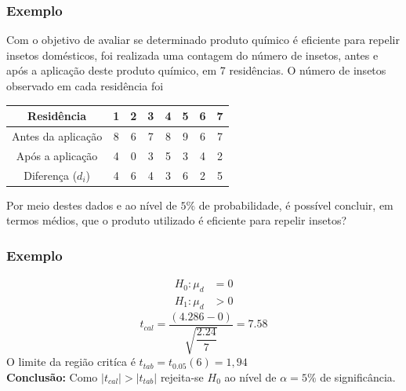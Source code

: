 \documentclass[14pt,aspectratio=1610]{beamer}
\newcommand{\Ho}{\ensuremath{H_{0}}}
\begin{document}
\begin{frame}{}
\frametitle{Exemplo}
\small
\begin{block}{}
\justifying
Com o objetivo de avaliar se determinado produto químico é eficiente para repelir insetos domésticos, foi realizada uma 
contagem do número de insetos, antes e após a aplicação deste produto químico, em 7 residências. O número de insetos 
observado em cada residência foi
\begin{table}[]
\begin{tabular}{c|ccccccc}
             Residência & 1 & 2 & 3 & 4 & 5 & 6 & 7\\ \hline
Antes da aplicação & 8 & 6 & 7 & 8 & 9 & 6 & 7 \\ 
Após a aplicação    & 4 & 0 & 3 & 5 & 3 & 4 & 2 \\ \hline
Diferença ($d_{i}$)      & 4 & 6 & 4 & 3 & 6 & 2 & 5 \\ \hline
\end{tabular}
\end{table}
Por meio destes dados e ao nível de $5\%$ de probabilidade, é possível concluir, em termos médios, que o produto 
utilizado é eficiente para repelir insetos?
\end{block}
\end{frame}

\begin{frame}{}
\frametitle{Exemplo}
\begin{block}{}
\justifying
\begin{align*}
H_{0}: \mu_{d}&=0 \\ 
H_{1}: \mu_{d}&> 0
\end{align*}
$$t_{cal}=\dfrac{(4.286-0)}{\sqrt{\dfrac{2.24}{7}}}=7.58$$
O limite da região critíca é $t_{tab}=t_{0.05}(6)=1,94$\\
\textbf{Conclusão:} Como $|t_{cal}|>|t_{tab}|$ rejeita-se $\Ho$ ao nível de $\alpha=5\%$ de significância.
\end{block}
\end{frame}
\end{document}
